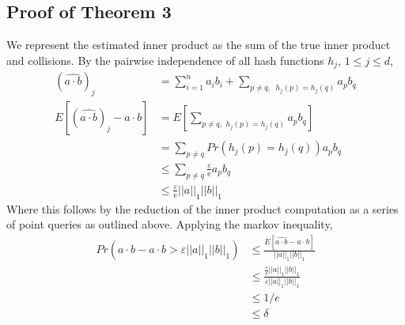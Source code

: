 \documentclass[11pt]{article}
\begin{document}
{	\subsection{Proof of Theorem 3}
		We represent the estimated inner product as the sum of the true inner product and collisions. By the pairwise independence of all hash functions $h_j$, $1 \leq j \leq d$,
		\begin{align}
		(\widehat{a \cdot b})_j &= \sum_{i=1}^n a_ib_i + \sum_{p \neq q, \,\,\ h_j(p)=h_j(q)} a_pb_q \\
		E\left[(\widehat{a \cdot b})_j - a \cdot b\right] &= E\left[\sum_{p \neq q, \,\, h_j(p)=h_j(q)} a_pb_q\right] \\
		&= \sum_{p \neq q}Pr(h_j(p) = h_j(q))a_pb_q \\
		&\leq \sum_{p \neq q} \frac{\varepsilon}{\mathrm{e}}a_pb_q \\
		&\leq \frac{\varepsilon}{\mathrm e}||a||_1||b||_1
		\end{align}
		Where this follows by the reduction of the inner product computation as a series of point queries as outlined above. Applying the markov inequality,
		\begin{align}
		Pr(\widehat{a \cdot b} - a \cdot b > \varepsilon ||a||_1||b||_1) &\leq \frac{E[\widehat{a \cdot b} - a \cdot b]}{||a||_1||b||_1} \\
		&\leq \frac{\frac{\varepsilon}{\mathrm e}||a||_1||b||_1}{\varepsilon||a||_1||b||_1} \\
		& \leq 1/e \\
		&\leq \delta
		\end{align}

}
\end{document}
